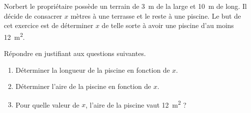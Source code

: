 
\begin{exercice}\label{exosmath-0965}

    Norbert le propriétaire possède un terrain de \SI{3}{\meter} de la large et \SI{10}{\meter} de long. Il décide de consacrer \( x\) mètres à une terrasse et le reste à une piscine. Le but de cet exercice est de déterminer \( x\) de telle sorte à avoir une piscine d'au moins \SI{12}{\meter\squared}.

\begin{center}
   
\end{center}

Répondre en justifiant aux questions suivantes.
\begin{enumerate}
    \item
        Déterminer la longueur de la piscine en fonction de \( x\).
    \item
        Déterminer l'aire de la piscine en fonction de \( x\).
    \item
        Pour quelle valeur de \( x\), l'aire de la piscine vaut \SI{12}{\meter\squared} ?
\end{enumerate}

\end{exercice}
